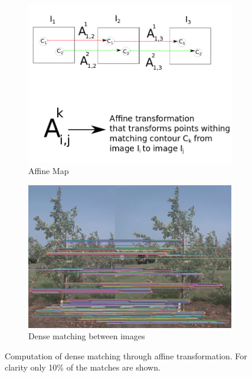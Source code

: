\begin{figure}[!htbp]
        \begin{subfigure}[t]{0.3\textwidth}
            \includegraphics[width=\textwidth]{figures/isfm/affinemap.png}           
         \caption{Affine Map}
         \label{fig:affinemap}
       \end{subfigure} \quad \begin{subfigure}[t]{0.5\textwidth}
                \includegraphics[width=\textwidth]{figures/isfm/MatchingBetweenImages1.jpg}
                \caption{Dense matching between images \label{fig:densematch}}
                \label{fig:matching}
        \end{subfigure}
       
        
        
        
        \caption[Using fruit as features for dense correspondences]{Computation of dense matching through affine transformation. For clarity only 10\% of the matches are shown.}
        \label{fig:totalaffine}
\end{figure}

